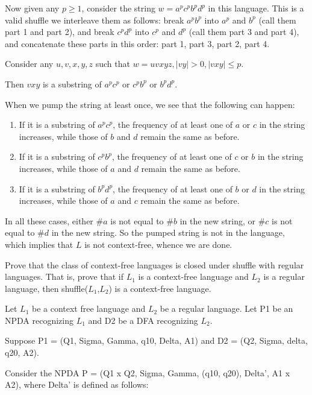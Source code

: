 \documentclass[answers]{exam}
\begin{document}
\begin{questions}
\begin{solution}
Now given any $p \ge 1$, consider the string $w = a^pc^pb^pd^p$ in this language. This is a valid shuffle we interleave them as follows: break $a^pb^p$ into $a^p$ and $b^p$ (call them part 1 and part
2), and break $c^pd^p$ into $c^p$ and $d^p$ (call them part 3 and part 4), and concatenate these parts in this order: part 1, part 3, part 2, part 4.

Consider any $u, v, x, y, z$ such that $w = uvxyz, |vy| > 0, |vxy| \le p$.

Then $vxy$ is a substring of $a^pc^p$ or $c^pb^p$ or $b^pd^p$.

When we pump the string at least once, we see that the following can happen:
\begin{enumerate}
    \item If it is a substring of $a^pc^p$, the frequency of at least one of $a$ or $c$ in the string increases, while those of $b$ and $d$ remain the same as before.
    \item If it is a substring of $c^pb^p$, the frequency of at least one of $c$ or $b$ in the string increases, while those of $a$ and $d$ remain the same as before.
    \item If it is a substring of $b^pd^p$, the frequency of at least one of $b$ or $d$ in the string increases, while those of $a$ and $c$ remain the same as before.
\end{enumerate}

In all these cases, either $\#a$ is not equal to $\#b$ in the new string, or $\#c$ is not equal to $\#d$ in the new string. So the pumped string is not in the language, which implies that $L$ is not context-free, whence we are done.

\end{solution}

\question[5]

Prove that the class of context-free languages is closed under shuffle with regular languages. That is, prove that if $L_1$ is a context-free language and $L_2$ is a regular language, then shuffle($L_1$,$L_2$) is a context-free language.

\begin{solution}

Let $L_1$ be a context free language and $L_2$ be a regular language.
Let P1 be an NPDA recognizing $L_1$ and D2 be a DFA recognizing $L_2$.

Suppose P1 = (Q1, Sigma, Gamma, q10, Delta, A1) and D2 = (Q2, Sigma, delta, q20, A2).

Consider the NPDA P = (Q1 x Q2, Sigma, Gamma, (q10, q20), Delta', A1 x A2), where Delta' is defined as follows:


\end{solution}
\end{questions}
\end{document}
